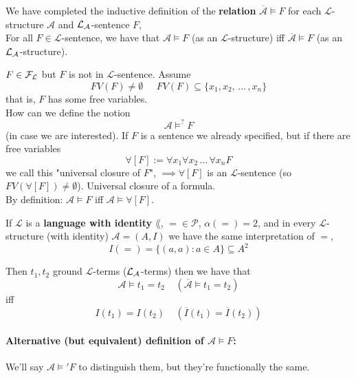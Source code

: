 We have completed the inductive definition of the \textbf{relation} $\overline{\mathcal{A}} \models F$ for each $\mathcal{L}$-structure $\mathcal{A}$ and $\mathcal{L}_\mathcal{A}$-sentence $F$,\\

For all $F \in \mathcal{L}$-sentence, we have that $\mathcal{A} \models F$ (as an $\mathcal{L}$-structure) iff $\overline{\mathcal{A}} \models F$ (as an $\mathcal{L}_\mathcal{A}$-structure).\\

\begin{remark}
	$F \in \mathcal{F}_\mathcal{L}$ but $F$ is not in $\mathcal{L}$-sentence. Assume
	$$ FV(F) \neq \emptyset \;\;\;\;\; FV(F) \subseteq \{x_1, x_2, \, \dots \, , x_n\} $$
	that is, $F$ has some free variables.\\
	
	How can we define the notion
	$$ \mathcal{A} \models^? F $$
	(in case we are interested). If $F$ is a sentence we already specified, but if there are free variables 
	$$ \forall [F] := \forall x_1 \forall x_2 \, \dots \, \forall x_n F$$
	we call this "universal closure of $F$", $\implies \forall [F]$ is an $\mathcal{L}$-sentence (so $FV(\forall[F]) \neq \emptyset$). Universal closure of a formula.\\
	By definition: $\mathcal A \models F$ iff $\mathcal A \models \forall [F]$.\\
\end{remark}

\begin{remark}
	If $\mathcal{L}$ is a \textbf{language with identity} $\lang$, $= \in \mathcal{P}$, $\alpha(=) = 2$, and in every $\mathcal{L}$-structure (with identity) $\mathcal{A} = (A,I)$ we have the same interpretation of $=$, 
	$$ I(=) = \{(a,a): a \in A\} \subseteq A^2 $$
	
	Then $t_1, t_2$ ground $\mathcal{L}$-terms ($\mathcal{L}_\mathcal{A}$-terms) then we have that 
	$$ \mathcal{A} \models t_1 = t_2 \;\;\;\; (\overline{\mathcal{A}} \models t_1 = t_2) $$
	iff
	$$ I(t_1) = I(t_2) \;\;\;\; (\overline I (t_1) = \overline I (t_2)) $$
\end{remark}


\paragraph{Alternative (but equivalent) definition of $\mathcal{A} \models F$:} We'll say $\mathcal{A} \models' F$ to distinguish them, but they're functionally the same.\\

